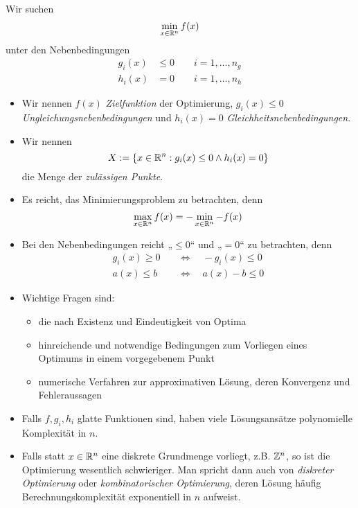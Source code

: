 \documentclass[
]{mycourse}
\begin{document}
Wir suchen
\[
	\min_{x \in \mathbb{R}^n} f(x)
\]
unter den Nebenbedingungen
\begin{align*}
	g_i(x) &\le 0 \qquad i=1,\dotsc, n_g \\
	h_i(x) &= 0 \qquad i = 1,\dotsc, n_h
\end{align*}
\begin{itemize}
	\item
		Wir nennen $f(x)$ \emph{Zielfunktion} der Optimierung, $g_i(x) \le 0$ \emph{Ungleichungsnebenbedingungen} und $h_i(x)=0$ \emph{Gleichheitsnebenbedingungen}.
	\item
		Wir nennen
		\[
			X := \{x\in \mathbb{R}^n : g_i(x) \le 0 \land h_i(x) = 0 \}
		\]
		die Menge der \emph{zulässigen Punkte}.
	\item
		Es reicht, das Minimierungsproblem zu betrachten, denn
		\[
			\max_{x\in \mathbb{R}^n} f(x) = -\min_{x\in\mathbb{R}^n} -f(x)
		\]
	\item
		Bei den Nebenbedingungen reicht „$\le 0$“ und „$= 0$“ zu betrachten, denn
		\begin{align*}
			g_i(x) \ge 0 \quad &\iff \quad -g_i(x) \le 0 \\
			a(x) \le b \quad &\iff \quad a(x) - b \le 0
		\end{align*}
	\item
		Wichtige Fragen sind:
		\begin{itemize}
			\item
				die nach Existenz und Eindeutigkeit von Optima 
			\item
				hinreichende und notwendige Bedingungen zum Vorliegen eines Optimums in einem vorgegebenem Punkt
			\item
				numerische Verfahren zur approximativen Lösung, deren Konvergenz und Fehleraussagen
		\end{itemize}
	\item
		Falls $f,g_i,h_i$ glatte Funktionen sind, haben viele Lösungsansätze polynomielle Komplexität in $n$.
	\item
		Falls statt $x\in\mathbb{R}^n$ eine diskrete Grundmenge vorliegt, z.B. $\mathbb{Z}^n$, so ist die Optimierung wesentlich schwieriger.
		Man spricht dann auch von \emph{diskreter Optimierung} oder \emph{kombinatorischer Optimierung}, deren Lösung häufig Berechnungskomplexität exponentiell in $n$ aufweist.
\end{itemize}
\end{document}
